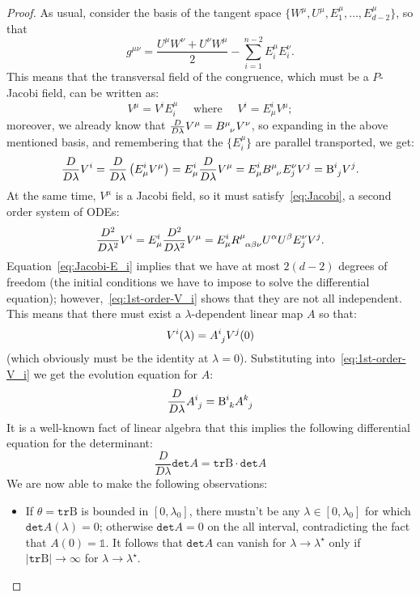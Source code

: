 \begin{proof}
	As usual, consider the basis of the tangent space \(\{W^{\mu}, U^{\mu}, E_1^{\mu}, \ldots, E_{d - 2}^{\mu}\}\), so that
	\[
	g^{\mu\nu} = \frac{U^{\mu}W^{\nu} + U^{\nu}W^{\mu}}{2} - \sum_{i=1}^{n - 2}E_i^{\mu}E_i^{\nu}.
	\]
	This means that the transversal field of the congruence, which must be a \(P\)-Jacobi field, can be written as:
	\[
	V^{\mu} = V^iE_i^{\mu} \quad \text{ where } \quad V^i = E^i_{\mu}V^{\mu};
	\]
	moreover, we already know that \(\frac{D}{D\lambda}V^{\mu} = B\indices{^{\mu}_{\nu}}V^{\nu}\), so expanding in the above mentioned basis, and remembering that the \(\{E_i^{\mu}\}\) are parallel transported, we get:
	\begin{equation}
	\label{eq:1st-order-V_i}
		\frac{D}{D\lambda}V^i = \frac{D}{D\lambda}\left(E^i_{\mu}V^{\mu}\right) = E^i_{\mu}\frac{D}{D\lambda}V^{\mu} = E^i_{\mu}B\indices{^{\mu}_{\nu}}E_j^{\nu}V^j = \mathrm{B}\indices{^i_j}V^j.
	\end{equation}
	At the same time, \(V^{\mu}\) is a Jacobi field, so it must satisfy~\eqref{eq:Jacobi}, a second order system of ODEs:
	\begin{equation}
		\label{eq:Jacobi-E_i}
		\frac{D^2}{D\lambda^2}V^i = E^i_{\mu}\frac{D^2}{D\lambda^2}V^{\mu} = E^i_{\mu}R\indices{^{\mu}_{\alpha\beta\nu}}U^{\alpha}U^{\beta}E_j^{\nu}V^j.
	\end{equation}
	Equation~\eqref{eq:Jacobi-E_i} implies that we have at most \(2(d - 2)\) degrees of freedom (the initial conditions we have to impose to solve the differential equation); however,~\eqref{eq:1st-order-V_i} shows that they are not all independent. This means that there must exist a \(\lambda\)-dependent linear map \(A\) so that:
	\[
	V^i(\lambda) = A\indices{^i_j}V^j(0)
	\]
	(which obviously must be the identity at \(\lambda = 0\)).
	Substituting into~\eqref{eq:1st-order-V_i} we get the evolution equation for \(A\):
	\[
	\frac{D}{D\lambda}A\indices{^i_j} = \mathrm{B}\indices{^i_k}A\indices{^k_j}
	\]
	It is a well-known fact of linear algebra that this implies the following differential equation for the determinant: %
	\begin{equation}
	\label{eq;det-A}
		\frac{D}{D\lambda}\texttt{det}A = \texttt{tr}\mathrm{B}\cdot \texttt{det}A 
	\end{equation}
	We are now able to make the following observations:
	\begin{itemize}
		\item[\ding{99}] If \(\theta = \texttt{tr}\mathrm{B}\) is bounded in \([0, \lambda_0]\), there mustn't be any \(\lambda \in [0, \lambda_0]\) for which \(\texttt{det}A(\lambda) = 0\); otherwise \(\texttt{det}A = 0\) on the all interval, contradicting the fact that \(A(0) = \mathbb{1}\). It follows that \(\texttt{det}A\) can vanish for \(\lambda \rightarrow \lambda^{\star}\) only if \(\vert\texttt{tr}\mathrm{B}\vert \rightarrow \infty\) for \(\lambda \rightarrow \lambda^{\star}\).

\end{itemize}
\end{proof}
